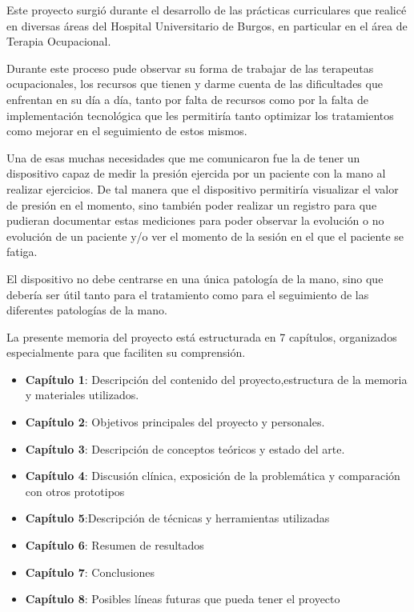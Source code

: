 Este proyecto surgió durante el desarrollo de las prácticas curriculares que realicé en diversas áreas del Hospital Universitario de Burgos, en particular en el área de Terapia Ocupacional. 

Durante este proceso pude observar su forma de trabajar de las terapeutas ocupacionales, los recursos que tienen y darme cuenta de las dificultades que enfrentan en su día a día, tanto por falta de recursos como por la falta de implementación tecnológica que les permitiría tanto optimizar los tratamientos como mejorar en el seguimiento de estos mismos.

Una de esas muchas necesidades que me comunicaron fue la de tener un dispositivo capaz de medir la presión ejercida por un paciente con la mano al realizar ejercicios. De tal manera que el dispositivo permitiría visualizar el valor de presión en el momento, sino también poder realizar un registro para que pudieran documentar estas mediciones para poder observar la evolución o no evolución de un paciente y/o ver el momento de la sesión en el que el paciente se fatiga.

El dispositivo no debe centrarse en una única patología de la mano, sino que debería ser útil tanto para el tratamiento como para el seguimiento de las diferentes patologías de la mano.

La presente memoria del proyecto está estructurada en 7 capítulos, organizados especialmente para que faciliten su comprensión.
\begin{itemize}
    \item \textbf{Capítulo 1}: Descripción del contenido del proyecto,estructura de la memoria y materiales utilizados.
    \item \textbf{Capítulo 2}: Objetivos principales del proyecto y personales.
    \item \textbf{Capítulo 3}: Descripción de conceptos teóricos y estado del arte.
    \item \textbf{Capítulo 4}: Discusión clínica, exposición de la problemática y comparación con otros prototipos
     \item \textbf{Capítulo 5}:Descripción de técnicas y herramientas utilizadas
    \item \textbf{Capítulo 6}: Resumen de resultados 
    \item \textbf{Capítulo 7}: Conclusiones 
    \item \textbf{Capítulo 8}: Posibles líneas futuras que pueda tener el proyecto
\end{itemize}